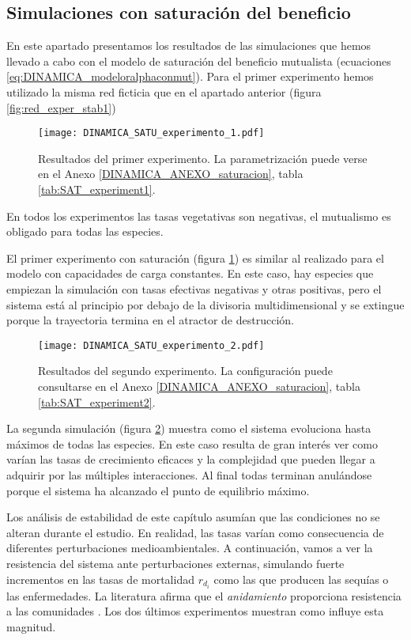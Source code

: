 \subsection{Simulaciones con saturación del beneficio}
\label{results_alfa}

En este apartado presentamos los resultados de las simulaciones que hemos llevado a cabo con el modelo de saturación del beneficio mutualista (ecuaciones \ref{eq:DINAMICA_modeloralphaconmut}). Para el primer experimento hemos utilizado la misma red ficticia que en el apartado anterior (figura \ref{fig:red_exper_stab1})

\begin{figure}[b!]
\centering
\texttt{[image: DINAMICA\_SATU\_experimento\_1.pdf]}
\caption {Resultados del primer experimento. La parametrización puede verse en el Anexo \ref{DINAMICA_ANEXO_saturacion}, tabla \ref{tab:SAT_experiment1}.}
\label{fig:DINAMICA_SAT_exper_stab1}
\end{figure}

En todos los experimentos las tasas vegetativas son negativas, el mutualismo es obligado para todas las especies.

El primer experimento con saturación (figura \ref{fig:DINAMICA_SAT_exper_stab1}) es similar al realizado para el modelo con capacidades de carga constantes. En este caso, hay especies que empiezan la simulación con tasas efectivas negativas y otras positivas, pero el sistema está al principio por debajo de la divisoria multidimensional y se extingue porque la trayectoria termina en el atractor de destrucción.

\begin{figure}[h!]
\centering
\texttt{[image: DINAMICA\_SATU\_experimento\_2.pdf]}
\caption {Resultados del segundo experimento. La configuración puede consultarse en el Anexo  \ref{DINAMICA_ANEXO_saturacion}, tabla \ref{tab:SAT_experiment2}.}
\label{fig:DINAMICA_SAT_exper_stab2}
\end{figure}

La segunda simulación (figura \ref{fig:DINAMICA_SAT_exper_stab2}) muestra como el sistema evoluciona hasta máximos de todas las especies. En este caso resulta de gran interés ver como varían las tasas de crecimiento eficaces y la complejidad que pueden llegar a adquirir por las múltiples interacciones. Al final todas terminan anulándose porque el sistema ha alcanzado el punto de equilibrio máximo. 

Los análisis de estabilidad de este capítulo asumían que las condiciones no se alteran durante el estudio. En realidad, las tasas varían como consecuencia de diferentes perturbaciones medioambientales. A continuación, vamos a ver la resistencia del sistema ante perturbaciones externas, simulando fuerte incrementos en las tasas de mortalidad $r_{d_i}$ como las que producen las sequías o las enfermedades. La literatura afirma que el \emph{anidamiento} proporciona resistencia a las comunidades \citep{bascompte2003nested}. Los dos últimos experimentos muestran como influye esta magnitud.


